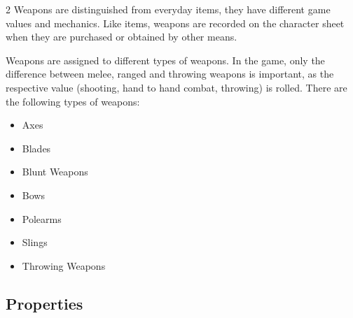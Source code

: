 \begin{multicols}{2}
Weapons are distinguished from everyday items, they have different game values and mechanics. Like items, weapons are recorded on the character sheet when they are purchased or obtained by other means.

Weapons are assigned to different types of weapons. In the game, only the difference between melee, ranged and throwing weapons is important, as the respective value (shooting, hand to hand combat, throwing) is rolled. There are the following types of weapons:
\begin{itemize}
    \item Axes
    \item Blades
    \item Blunt Weapons
    \item Bows
    \item Polearms
    \item Slings
    \item Throwing Weapons
\end{itemize}


\subsection{Properties}


\end{multicols}
